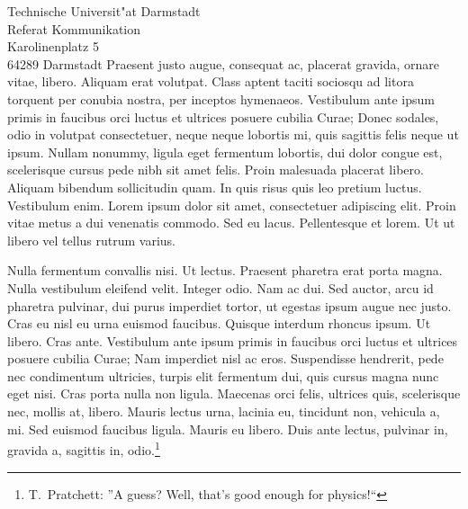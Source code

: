 \documentclass[adr=clemens,accentcolor=tud9c,twoside]{tudletter}
\begin{document}
\begin{letter}{%
    Technische Universit"at Darmstadt\\%
    Referat Kommunikation\\%
    Karolinenplatz 5\\%
    64289 Darmstadt}
    Praesent justo augue, consequat ac, placerat gravida, ornare vitae, libero. Aliquam erat
    volutpat. Class aptent taciti sociosqu ad litora torquent per conubia nostra, per inceptos
    hymenaeos. Vestibulum ante ipsum primis in faucibus orci luctus et ultrices posuere cubilia
    Curae; Donec sodales, odio in volutpat consectetuer, neque neque lobortis mi, quis sagittis
    felis neque ut ipsum. Nullam nonummy, ligula eget fermentum lobortis, dui dolor congue est,
    scelerisque cursus pede nibh sit amet felis. Proin malesuada placerat libero. Aliquam bibendum
    sollicitudin quam. In quis risus quis leo pretium luctus. Vestibulum enim. Lorem ipsum dolor
    sit amet, consectetuer adipiscing elit. Proin vitae metus a dui venenatis commodo. Sed eu
    lacus. Pellentesque et lorem. Ut ut libero vel tellus rutrum varius.

    Nulla fermentum convallis nisi. Ut lectus. Praesent pharetra erat porta magna. Nulla vestibulum
    eleifend velit. Integer odio. Nam ac dui. Sed auctor, arcu id pharetra pulvinar, dui purus
    imperdiet tortor, ut egestas ipsum augue nec justo. Cras eu nisl eu urna euismod faucibus.
    Quisque interdum rhoncus ipsum. Ut libero. Cras ante. Vestibulum ante ipsum primis in faucibus
    orci luctus et ultrices posuere cubilia Curae; Nam imperdiet nisl ac eros. Suspendisse
    hendrerit, pede nec condimentum ultricies, turpis elit fermentum dui, quis cursus magna nunc
    eget nisi. Cras porta nulla non ligula. Maecenas orci felis, ultrices quis, scelerisque nec,
    mollis at, libero. Mauris lectus urna, lacinia eu, tincidunt non, vehicula a, mi. Sed euismod
    faucibus ligula. Mauris eu libero. Duis ante lectus, pulvinar in, gravida a, sagittis in,
    odio.\footnote{T.\ Pratchett: ''A guess? Well, that's good enough for physics!{``}}


\end{letter}
\end{document}
